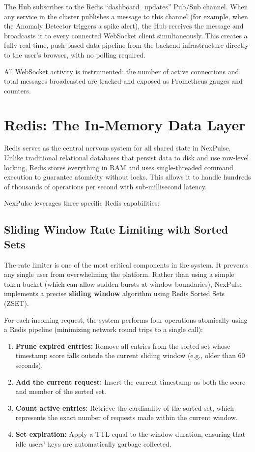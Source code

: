 \documentclass[12pt,a4paper]{article}
\begin{document}
The Hub subscribes to the Redis ``dashboard\_updates'' Pub/Sub channel. When any service in the cluster publishes a message to this channel (for example, when the Anomaly Detector triggers a spike alert), the Hub receives the message and broadcasts it to every connected WebSocket client simultaneously. This creates a fully real-time, push-based data pipeline from the backend infrastructure directly to the user's browser, with no polling required.

All WebSocket activity is instrumented: the number of active connections and total messages broadcasted are tracked and exposed as Prometheus gauges and counters.

\section{Redis: The In-Memory Data Layer}

Redis serves as the central nervous system for all shared state in NexPulse. Unlike traditional relational databases that persist data to disk and use row-level locking, Redis stores everything in RAM and uses single-threaded command execution to guarantee atomicity without locks. This allows it to handle hundreds of thousands of operations per second with sub-millisecond latency.

NexPulse leverages three specific Redis capabilities:

\subsection{Sliding Window Rate Limiting with Sorted Sets}

The rate limiter is one of the most critical components in the system. It prevents any single user from overwhelming the platform. Rather than using a simple token bucket (which can allow sudden bursts at window boundaries), NexPulse implements a precise \textbf{sliding window} algorithm using Redis Sorted Sets (ZSET).

For each incoming request, the system performs four operations atomically using a Redis pipeline (minimizing network round trips to a single call):

\begin{enumerate}[leftmargin=2em]
    \item \textbf{Prune expired entries:} Remove all entries from the sorted set whose timestamp score falls outside the current sliding window (e.g., older than 60 seconds).
    \item \textbf{Add the current request:} Insert the current timestamp as both the score and member of the sorted set.
    \item \textbf{Count active entries:} Retrieve the cardinality of the sorted set, which represents the exact number of requests made within the current window.
    \item \textbf{Set expiration:} Apply a TTL equal to the window duration, ensuring that idle users' keys are automatically garbage collected.
\end{enumerate}
\end{document}
